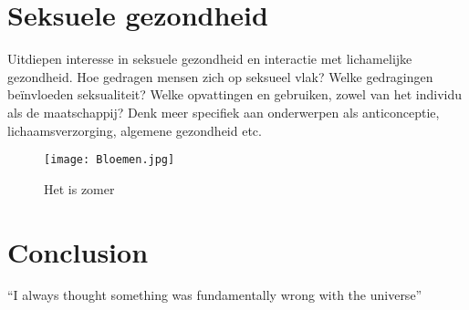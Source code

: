 \documentclass{article}
\begin{document}
\section{Seksuele gezondheid}
Uitdiepen interesse in seksuele gezondheid en interactie met lichamelijke gezondheid. 
Hoe gedragen mensen zich op seksueel vlak? Welke gedragingen beïnvloeden seksualiteit? Welke opvattingen en gebruiken, zowel van het individu als de maatschappij? 
Denk meer specifiek aan onderwerpen als anticonceptie, lichaamsverzorging, algemene gezondheid etc. 

\begin{figure}[ht!]
\centering
\texttt{[image: Bloemen.jpg]}
\caption{Het is zomer}
\label{fig:bloemen}
\end{figure}

\section{Conclusion}
``I always thought something was fundamentally wrong with the universe'' \citep{adams1995hitchhiker}



\end{document}
